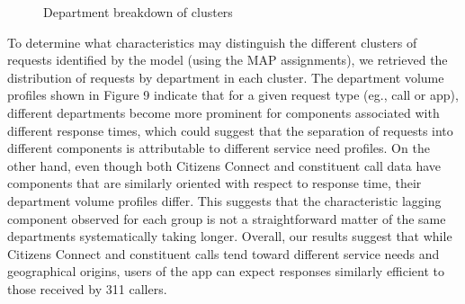\documentclass[twoside]{article}
\theoremstyle{theorem}
\theoremstyle{theorem}
\theoremstyle{theorem}
\theoremstyle{lemma}
\theoremstyle{definition}
\theoremstyle{example}
\begin{document}
\begin{figure}
\begin{center} \label{profiles}
\caption{Department breakdown of clusters}
\hskip1cm
\end{center}
\vskip -0.2in
\end{figure} 

To determine what characteristics may distinguish the different clusters of requests identified by the model (using the MAP assignments), we retrieved the distribution of requests by department in each cluster. The department volume profiles shown in Figure 9 indicate that for a given request type (eg., call or app), different departments become more prominent for components associated with different response times, which could suggest that the separation of requests into different components is attributable to different service need profiles. On the other hand, even though both Citizens Connect and constituent call data have components that are similarly oriented with respect to response time, their department volume profiles differ. This suggests that the characteristic lagging component observed for each group is not a straightforward matter of the same departments systematically taking longer.  Overall, our results suggest that while Citizens Connect and constituent calls tend toward different service needs and geographical origins, users of the app can expect responses similarly efficient to those received by 311 callers.




\end{document}
